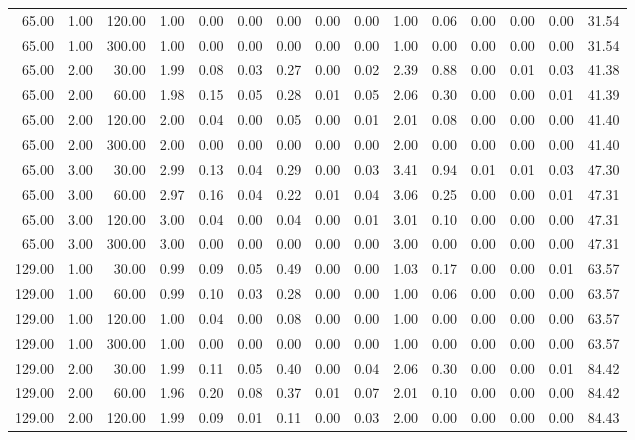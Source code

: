 \begin{table}[ht]
\begin{tabular}{rrrrrrrrrrrrrrr}
  65.00 & 1.00 & 120.00 & 1.00 & 0.00 & 0.00 & 0.00 & 0.00 & 0.00 & 1.00 & 0.06 & 0.00 & 0.00 & 0.00 & 31.54 \\ 
  65.00 & 1.00 & 300.00 & 1.00 & 0.00 & 0.00 & 0.00 & 0.00 & 0.00 & 1.00 & 0.00 & 0.00 & 0.00 & 0.00 & 31.54 \\ 
  65.00 & 2.00 & 30.00 & 1.99 & 0.08 & 0.03 & 0.27 & 0.00 & 0.02 & 2.39 & 0.88 & 0.00 & 0.01 & 0.03 & 41.38 \\ 
  65.00 & 2.00 & 60.00 & 1.98 & 0.15 & 0.05 & 0.28 & 0.01 & 0.05 & 2.06 & 0.30 & 0.00 & 0.00 & 0.01 & 41.39 \\ 
  65.00 & 2.00 & 120.00 & 2.00 & 0.04 & 0.00 & 0.05 & 0.00 & 0.01 & 2.01 & 0.08 & 0.00 & 0.00 & 0.00 & 41.40 \\ 
  65.00 & 2.00 & 300.00 & 2.00 & 0.00 & 0.00 & 0.00 & 0.00 & 0.00 & 2.00 & 0.00 & 0.00 & 0.00 & 0.00 & 41.40 \\ 
  65.00 & 3.00 & 30.00 & 2.99 & 0.13 & 0.04 & 0.29 & 0.00 & 0.03 & 3.41 & 0.94 & 0.01 & 0.01 & 0.03 & 47.30 \\ 
  65.00 & 3.00 & 60.00 & 2.97 & 0.16 & 0.04 & 0.22 & 0.01 & 0.04 & 3.06 & 0.25 & 0.00 & 0.00 & 0.01 & 47.31 \\ 
  65.00 & 3.00 & 120.00 & 3.00 & 0.04 & 0.00 & 0.04 & 0.00 & 0.01 & 3.01 & 0.10 & 0.00 & 0.00 & 0.00 & 47.31 \\ 
  65.00 & 3.00 & 300.00 & 3.00 & 0.00 & 0.00 & 0.00 & 0.00 & 0.00 & 3.00 & 0.00 & 0.00 & 0.00 & 0.00 & 47.31 \\ 
  129.00 & 1.00 & 30.00 & 0.99 & 0.09 & 0.05 & 0.49 & 0.00 & 0.00 & 1.03 & 0.17 & 0.00 & 0.00 & 0.01 & 63.57 \\ 
  129.00 & 1.00 & 60.00 & 0.99 & 0.10 & 0.03 & 0.28 & 0.00 & 0.00 & 1.00 & 0.06 & 0.00 & 0.00 & 0.00 & 63.57 \\ 
  129.00 & 1.00 & 120.00 & 1.00 & 0.04 & 0.00 & 0.08 & 0.00 & 0.00 & 1.00 & 0.00 & 0.00 & 0.00 & 0.00 & 63.57 \\ 
  129.00 & 1.00 & 300.00 & 1.00 & 0.00 & 0.00 & 0.00 & 0.00 & 0.00 & 1.00 & 0.00 & 0.00 & 0.00 & 0.00 & 63.57 \\ 
  129.00 & 2.00 & 30.00 & 1.99 & 0.11 & 0.05 & 0.40 & 0.00 & 0.04 & 2.06 & 0.30 & 0.00 & 0.00 & 0.01 & 84.42 \\ 
  129.00 & 2.00 & 60.00 & 1.96 & 0.20 & 0.08 & 0.37 & 0.01 & 0.07 & 2.01 & 0.10 & 0.00 & 0.00 & 0.00 & 84.42 \\ 
  129.00 & 2.00 & 120.00 & 1.99 & 0.09 & 0.01 & 0.11 & 0.00 & 0.03 & 2.00 & 0.00 & 0.00 & 0.00 & 0.00 & 84.43 \\ 

\end{tabular}
\end{table}
